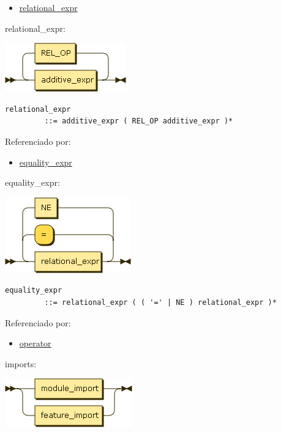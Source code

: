 \begin{itemize}
\tightlist
\item
  \protect\hyperlink{relational_expr}{relational\_expr}
\end{itemize}

\protect\hypertarget{relational_expr}{}{relational\_expr:}

\includegraphics[width=2.06250in,height=0.83333in]{diagram/relational_expr.png}

\begin{verbatim}
relational_expr
         ::= additive_expr ( REL_OP additive_expr )*
\end{verbatim}

Referenciado por:

\begin{itemize}
\tightlist
\item
  \protect\hyperlink{equality_expr}{equality\_expr}
\end{itemize}

\protect\hypertarget{equality_expr}{}{equality\_expr:}

\includegraphics[width=2.14583in,height=1.29167in]{diagram/equality_expr.png}

\begin{verbatim}
equality_expr
         ::= relational_expr ( ( '=' | NE ) relational_expr )*
\end{verbatim}

Referenciado por:

\begin{itemize}
\tightlist
\item
  \protect\hyperlink{operator}{operator}
\end{itemize}

\protect\hypertarget{imports}{}{imports:}

\includegraphics[width=2.16667in,height=0.83333in]{diagram/imports.png}

